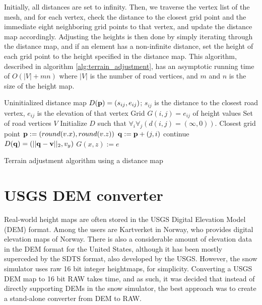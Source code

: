 Initially, all distances are set to infinity. Then, we traverse the vertex list of the mesh, and for each vertex, check the distance to the closest grid point and the immediate eight neighboring grid points to that vertex, and update the distance map accordingly. Adjusting the heights is then done by simply iterating through the distance map, and if an element has a non-infinite distance, set the height of each grid point to the height specified in the distance map. This algorithm, described in algorithm \ref{alg:terrain_adjustment}, has an asymptotic running time of $O(|V|+mn)$ where $|V|$ is the number of road vertices, and $m$ and $n$ is the size of the height map.

\begin{algorithm}
\begin{algorithmic}
\REQUIRE Uninitialized distance map $D({\mathbf p}) = (s_{ij}, e_{ij})$; $s_{ij}$ is the distance to the closest road vertex, $e_{ij}$ is the elevation of that vertex
\REQUIRE Grid $G(i,j) = e_{ij}$ of height values
\REQUIRE Set of road vertices $V$
\STATE Initialize $D$ such that $\forall_i\forall_j (d(i,j) = (\infty, 0))$. 
    \STATE Closest grid point ${\mathbf p} := (round(v.x), round(v.z))$
            \STATE ${\mathbf q} := {\mathbf p} + (j,i)$
                \STATE continue
            \ENDIF
                \STATE $D({\mathbf q}) = (||{\mathbf q}-{\mathbf v}||_2, v_y)$
            \ENDIF
        \ENDFOR
    \ENDFOR
\ENDFOR
{}
        \STATE $G(x,z) := e$
    \ENDIF
\ENDFOR
\end{algorithmic}
\caption{Terrain adjustment algorithm using a distance map}
\label{alg:terrain_adjustment}
\end{algorithm}


\section{USGS DEM converter}
Real-world height maps are often stored in the USGS Digital Elevation Model (DEM) format. Among the users are Kartverket in Norway, who provides digital elevation maps of Norway. There is also a considerable amount of elevation data in the DEM format for the United States, although it has been mostly superceded by the SDTS format, also developed by the USGS\cite{wiki_usgsdem}. However, the snow simulator uses raw 16 bit integer heightmaps, for simplicity. Converting a USGS DEM map to 16 bit RAW takes time, and as such, it was decided that instead of directly supporting DEMs in the snow simulator, the best approach was to create a stand-alone converter from DEM to RAW.


